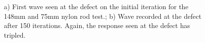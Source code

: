   \begin{figure}
 \begin{subfigmatrix}{2}
 \end{subfigmatrix}

    \caption
    { \label{fig:nylonExp2}
    a) First wave seen at the defect on the initial iteration for the 148mm and 75mm nylon rod test.; b) Wave recorded at the defect after 150 iterations. Again, the response seen at the defect has tripled.
  }
 \end{figure}
 

